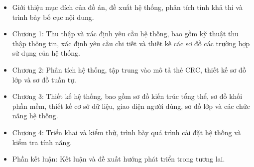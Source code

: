 \begin{adjustwidth}{1.5em}{}
\begin{itemize}
  \item Giới thiệu mục đích của đồ án, đề xuất hệ thống, phân tích tính khả thi và trình bày bố cục nội dung.
  \item Chương 1: Thu thập và xác định yêu cầu hệ thống, bao gồm kỹ thuật thu thập thông tin, xác định yêu cầu chi tiết và thiết kế các sơ đồ các trường hợp sử dụng của hệ thống.
  \item Chương 2: Phân tích hệ thống, tập trung vào mô tả thẻ CRC, thiết kế sơ đồ lớp và sơ đồ tuần tự.
  \item Chương 3: Thiết kế hệ thống, bao gồm sơ đồ kiến trúc tổng thể, sơ đồ khối phần mềm, thiết kế cơ sở dữ liệu, giao diện người dùng, sơ đồ lớp và các chức năng hệ thống.
  \item Chương 4: Triển khai và kiểm thử, trình bày quá trình cài đặt hệ thống và kiểm tra tính năng.
  \item Phần kết luận: Kết luận và đề xuất hướng phát triển trong tương lai.
\end{itemize}
\end{adjustwidth}

\cleardoublepage

